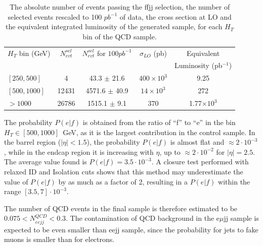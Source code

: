 \documentclass{cmspaper}
\begin{document}
\begin{linenumbers}
\begin{table}[htbp]
\begin{center}
\begin{tabular}{|l|c|c|c|c|}
\hline\hline
 $H_T$ bin (GeV)   & $N_{evt}^{sel}$ & $N_{evt}^{sel}$ for $100pb^{-1}$ & $\sigma_{LO}$ (pb) & Equivalent           \\
                         &                 &                                  &                    & Luminosity (pb$^{-1}$) \\
\hline\hline
$[250,500]$              &  4              & 43.3    $\pm$ 21.6               & $400 \times 10^3$  &  9.25                \\
$[500,1000]$             &  12431          & 4571.6  $\pm$ 40.9               & $14 \times 10^3$   &  272                 \\
$>1000$                  &  26786          & 1515.1  $\pm$ 9.1                & $370$              &  1.77$\times 10^3$   \\
\hline\hline
\end{tabular}
\end{center}
\caption{The absolute number of events passing the ffjj selection, the number 
of selected events rescaled to 100 $pb^{-1}$ of data, the cross section at LO 
and the equivalent integrated luminosity of the generated sample, for each $H_T$ 
bin of the QCD sample.  }
\label{tab:ffjjSelection}
\end{table}


The probability $P(e|f)$ is obtained from the ratio of ``f'' to ``e'' in the bin  
$H_T\in[500,1000]$~GeV, as it is the largest contribution in the control sample.
In the barrel region ($|\eta|<1.5$), the probability $P(e|f)$ is almost flat and $\approx 2 \cdot 10^{-3}$,  
while in the endcap region it is increasing with $\eta$, up to $\approx 2 \cdot 10^{-2}$ 
for $|\eta|=2.5$. The average value found is $P(e|f) = 3.5 \cdot 10^{-3}$.
A closure test performed with relaxed ID and Isolation cuts shows 
that this method may underestimate the value of $P(e|f)$ by as much as a factor of 2,
resulting in a $P(e|f)$ within the range
$[3.5,7] \cdot 10^{-3}$.

The number of QCD events in the final sample is therefore estimated to be 
$0.075<N_{eejj}^{QCD}<0.3$. 
The contamination of QCD background in the e$\mu$jj sample 
is expected to be even smaller than eejj sample, since the probability for jets to fake muons 
is smaller than for electrons. %


\end{linenumbers}
\end{document}

